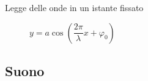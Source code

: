 \documentclass[a4paper,11pt,italian]{article}
\begin{document}
\begin{description}
%   
  \item[Legge delle onde in un istante fissato] $ y = a \cos\left(\dfrac{2 \pi}{\lambda}x + \varphi_0\right) $
%
%
%   
%   
\end{description}

\subsection{Suono}
\end{document}
